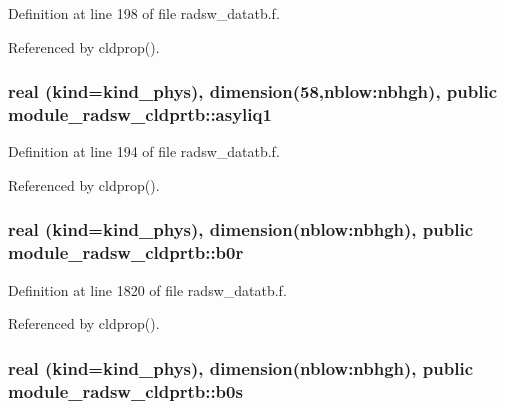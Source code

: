 Definition at line 198 of file radsw\+\_\+datatb.\+f.



Referenced by cldprop().

\subsubsection[{\texorpdfstring{asyliq1}{asyliq1}}]{\setlength{\rightskip}{0pt plus 5cm}real (kind=kind\+\_\+phys), dimension(58,nblow\+:nbhgh), public module\+\_\+radsw\+\_\+cldprtb\+::asyliq1}\hypertarget{group__module__radsw__main_ga430be0720aa2e2ac46aa1ec7c9a9b64b}{}\label{group__module__radsw__main_ga430be0720aa2e2ac46aa1ec7c9a9b64b}


Definition at line 194 of file radsw\+\_\+datatb.\+f.



Referenced by cldprop().

\subsubsection[{\texorpdfstring{b0r}{b0r}}]{\setlength{\rightskip}{0pt plus 5cm}real (kind=kind\+\_\+phys), dimension(nblow\+:nbhgh), public module\+\_\+radsw\+\_\+cldprtb\+::b0r}\hypertarget{group__module__radsw__main_gac39d49e73ffa960421e36e45a35db162}{}\label{group__module__radsw__main_gac39d49e73ffa960421e36e45a35db162}


Definition at line 1820 of file radsw\+\_\+datatb.\+f.



Referenced by cldprop().

\subsubsection[{\texorpdfstring{b0s}{b0s}}]{\setlength{\rightskip}{0pt plus 5cm}real (kind=kind\+\_\+phys), dimension(nblow\+:nbhgh), public module\+\_\+radsw\+\_\+cldprtb\+::b0s}\hypertarget{group__module__radsw__main_ga391fbdda62f6fba95e105c2041e16880}{}\label{group__module__radsw__main_ga391fbdda62f6fba95e105c2041e16880}


